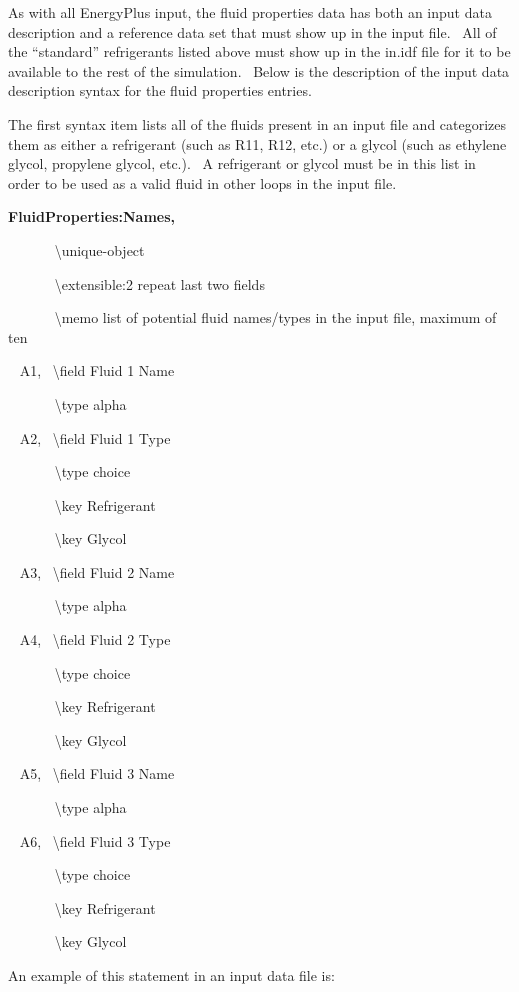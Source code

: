 As with all EnergyPlus input, the fluid properties data has both an input data description and a reference data set that must show up in the input file.~ All of the ``standard'' refrigerants listed above must show up in the in.idf file for it to be available to the rest of the simulation.~ Below is the description of the input data description syntax for the fluid properties entries.

The first syntax item lists all of the fluids present in an input file and categorizes them as either a refrigerant (such as R11, R12, etc.) or a glycol (such as ethylene glycol, propylene glycol, etc.).~ A refrigerant or glycol must be in this list in order to be used as a valid fluid in other loops in the input file.

\textbf{FluidProperties:Names,}

~~~~~~ \textbackslash{}unique-object

~~~~~~ \textbackslash{}extensible:2 repeat last two fields

~~~~~~ \textbackslash{}memo list of potential fluid names/types in the input file, maximum of ten

~ A1,~ \textbackslash{}field Fluid 1 Name

~~~~~~ \textbackslash{}type alpha

~ A2,~ \textbackslash{}field Fluid 1 Type

~~~~~~ \textbackslash{}type choice

~~~~~~ \textbackslash{}key Refrigerant

~~~~~~ \textbackslash{}key Glycol

~ A3,~ \textbackslash{}field Fluid 2 Name

~~~~~~ \textbackslash{}type alpha

~ A4,~ \textbackslash{}field Fluid 2 Type

~~~~~~ \textbackslash{}type choice

~~~~~~ \textbackslash{}key Refrigerant

~~~~~~ \textbackslash{}key Glycol

~ A5,~ \textbackslash{}field Fluid 3 Name

~~~~~~ \textbackslash{}type alpha

~ A6,~ \textbackslash{}field Fluid 3 Type

~~~~~~ \textbackslash{}type choice

~~~~~~ \textbackslash{}key Refrigerant

~~~~~~ \textbackslash{}key Glycol

An example of this statement in an input data file is:

